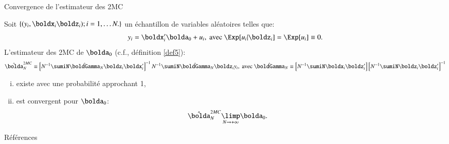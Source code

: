 \begin{frame}[allowframebreaks]{Convergence de l'estimateur des 2MC}
\begin{propriete}
    Soit $\{(y_i, \boldx_i \boldz_i); i=1, \ldots N.\}$ un échantillon de variables
    aléatoires  telles que:
    \begin{align*}
y_i = \boldx_i^\prime\bolda_0 + u_i, \ \text{avec} \ \Exp[u_i| \boldz_i] =\Exp[u_i] \equiv 0.
    \end{align*}
    L'estimateur des 2MC de $\bolda_0$ (c.f., définition \ref{def5}):
    \begin{align*}
        \hat{\bolda}_N^{2MC} \equiv 
        \left[
            N^{-1}\sumiN\hat{\boldGamma}_N\boldz_i\boldx_i^\prime
        \right]^{-1} 
        N^{-1}\sumiN\hat{\boldGamma}_N\boldz_iy_i, \ \text{avec} \
            \hat{\boldGamma}_N\equiv  
            \left[N^{-1}\sumiN\boldx_i\boldz_i^\prime\right]
            \left[N^{-1}\sumiN\boldz_i\boldz_i^\prime\right]^{-1}
        \end{align*}
        \begin{enumerate}[(i)]
            \item existe avec une probabilité approchant 1,
            \item est convergent pour $\bolda_0$:
            \begin{align*}
                \hat{\bolda}_N^{2MC} &\underset{N\to +\infty}{\limp} \bolda_0.
            \end{align*}
        \end{enumerate}
\end{propriete}
\end{frame}
\begin{frame}[allowframebreaks]{Références}

 
  \end{frame}




    
    